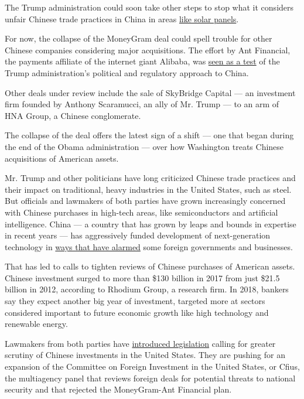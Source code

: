 The Trump administration could soon take other steps to stop what it
considers unfair Chinese trade practices in China in areas
\href{https://www.nytimes.com/2017/12/01/business/trump-china-trade-solar.html}{like
solar panels}.

For now, the collapse of the MoneyGram deal could spell trouble for
other Chinese companies considering major acquisitions. The effort by
Ant Financial, the payments affiliate of the internet giant Alibaba, was
\href{https://www.nytimes.com/2017/01/31/business/dealbook/moneygram-china-alibaba-ant-financial.html}{seen
as a test} of the Trump administration's political and regulatory
approach to China.

Other deals under review include the sale of SkyBridge Capital --- an
investment firm founded by Anthony Scaramucci, an ally of Mr. Trump ---
to an arm of HNA Group, a Chinese conglomerate.

The collapse of the deal offers the latest sign of a shift --- one that
began during the end of the Obama administration --- over how Washington
treats Chinese acquisitions of American assets.

Mr. Trump and other politicians have long criticized Chinese trade
practices and their impact on traditional, heavy industries in the
United States, such as steel. But officials and lawmakers of both
parties have grown increasingly concerned with Chinese purchases in
high-tech areas, like semiconductors and artificial intelligence. China
--- a country that has grown by leaps and bounds in expertise in recent
years --- has aggressively funded development of next-generation
technology in
\href{https://www.nytimes.com/2017/11/07/business/made-in-china-technology-trade.html}{ways
that have alarmed} some foreign governments and businesses.

That has led to calls to tighten reviews of Chinese purchases of
American assets. Chinese investment surged to more than \$130 billion in
2017 from just \$21.5 billion in 2012, according to Rhodium Group, a
research firm. In 2018, bankers say they expect another big year of
investment, targeted more at sectors considered important to future
economic growth like high technology and renewable energy.

Lawmakers from both parties have
\href{https://www.nytimes.com/2017/11/08/us/politics/china-foreign-investments.html}{introduced
legislation} calling for greater scrutiny of Chinese investments in the
United States. They are pushing for an expansion of the Committee on
Foreign Investment in the United States, or Cfius, the multiagency panel
that reviews foreign deals for potential threats to national security
and that rejected the MoneyGram-Ant Financial plan.

